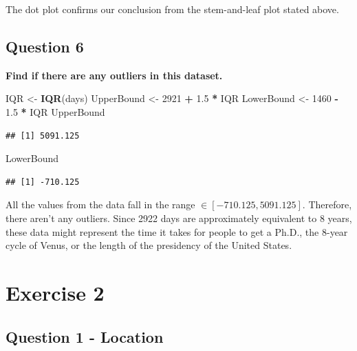 \documentclass[
]{book}
\newenvironment{Shaded}{\begin{snugshade}}{\end{snugshade}}
\newcommand{\DecValTok}[1]{\textcolor[rgb]{0.00,0.00,0.81}{#1}}
\newcommand{\FloatTok}[1]{\textcolor[rgb]{0.00,0.00,0.81}{#1}}
\newcommand{\FunctionTok}[1]{\textcolor[rgb]{0.13,0.29,0.53}{\textbf{#1}}}
\newcommand{\NormalTok}[1]{#1}
\newcommand{\OtherTok}[1]{\textcolor[rgb]{0.56,0.35,0.01}{#1}}
\newcommand{\SpecialCharTok}[1]{\textcolor[rgb]{0.81,0.36,0.00}{\textbf{#1}}}
\begin{document}
The dot plot confirms our conclusion from the stem-and-leaf plot stated above.

\section{Question 6}\label{question-6}

\textbf{Find if there are any outliers in this dataset.}

\begin{Shaded}
\begin{Highlighting}[]
\NormalTok{IQR }\OtherTok{\textless{}{-}} \FunctionTok{IQR}\NormalTok{(days)}
\NormalTok{UpperBound }\OtherTok{\textless{}{-}} \DecValTok{2921} \SpecialCharTok{+} \FloatTok{1.5} \SpecialCharTok{*}\NormalTok{ IQR}
\NormalTok{LowerBound }\OtherTok{\textless{}{-}} \DecValTok{1460} \SpecialCharTok{{-}} \FloatTok{1.5} \SpecialCharTok{*}\NormalTok{ IQR}
\NormalTok{UpperBound}
\end{Highlighting}
\end{Shaded}

\begin{verbatim}
## [1] 5091.125
\end{verbatim}

\begin{Shaded}
\begin{Highlighting}[]
\NormalTok{LowerBound}
\end{Highlighting}
\end{Shaded}

\begin{verbatim}
## [1] -710.125
\end{verbatim}

All the values from the data fall in the range \(\in [-710.125, 5091.125]\). Therefore, there aren't any outliers. Since 2922 days are approximately equivalent to 8 years, these data might represent the time it takes for people to get a Ph.D., the 8-year cycle of Venus, or the length of the presidency of the United States.

\chapter{Exercise 2}\label{exercise-2}

\section{Question 1 - Location}\label{question-1---location}
\end{document}
